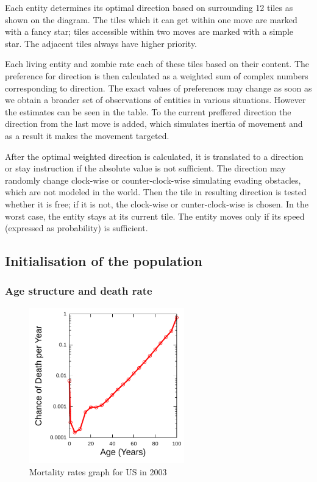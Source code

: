 \documentclass[a4paper]{article}
\begin{document}
Each entity determines its optimal direction based on surrounding 12 tiles as shown on the diagram.
The tiles which it can get within one move are marked with a fancy star; tiles accessible within two moves are marked with a simple star.
The adjacent tiles always have higher priority.

Each living entity and zombie rate each of these tiles based on their content.
The preference for direction is then calculated as a weighted sum of complex numbers corresponding to direction.
The exact values of preferences may change as soon as we obtain a broader set of observations of entities in various situations.
However the estimates can be seen in the table.
To the current preffered direction the direction from the last move is added, which simulates inertia of movement and as a result it makes the movement targeted.

After the optimal weighted direction is calculated, it is translated to a direction or stay instruction if the absolute value is not sufficient.
The direction may randomly change clock-wise or counter-clock-wise simulating evading obstacles, which are not modeled in the world.
Then the tile in resulting direction is tested whether it is free; if it is not, the clock-wise or cunter-clock-wise is chosen.
In the worst case, the entity stays at its current tile.
The entity moves only if its speed (expressed as probability) is sufficient.

\subsection{Initialisation of the population}

\subsubsection{Age structure and death rate}

\begin{figure}[ht]
    \centering
    \includegraphics[width=0.6\textwidth]{USGompertzCurve}
    \caption{Mortality rates graph for US in 2003}
\end{figure}
\end{document}
